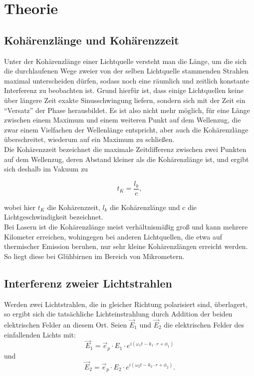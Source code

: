 \section{Theorie}

\subsection{Kohärenzlänge und Kohärenzzeit}
Unter der Kohärenzlänge einer Lichtquelle versteht man die Länge, um die sich die durchlaufenen Wege zweier von der selben Lichtquelle stammenden Strahlen maximal unterscheiden dürfen, sodass noch eine räumlich und zeitlich konstante Interferenz zu beobachten ist. Grund hierfür ist, dass einige Lichtquellen keine über längere Zeit exakte Sinusschwingung liefern, sondern sich mit der Zeit ein \enquote{Versatz} der Phase herausbildet. Es ist also nicht mehr möglich, für eine Länge zwischen einem Maximum und einem weiteren Punkt auf dem Wellenzug, die zwar einem Vielfachen der Wellenlänge entspricht, aber auch die Kohärenzlänge überschreitet, wiederum auf ein Maximum zu schließen. \\
Die Kohärenzzeit bezeichnet die maximale Zeitdifferenz zwischen zwei Punkten auf dem Wellenzug, deren Abstand kleiner als die Kohärenzlänge ist, und ergibt sich deshalb im Vakuum zu 

\begin{equation}
t_{K} = \frac{l_{k}}{c},
\end{equation}

wobei hier $ t_{K} $ die Kohärenzzeit, $ l_{k} $ die Kohärenzlänge und c die Lichtgeschwindigkeit bezeichnet. \\
Bei Lasern ist die Kohärenzlänge meist verhältnismäßig groß und kann mehrere Kilometer erreichen, wohingegen bei anderen Lichtquellen, die etwa auf thermischer Emission beruhen, nur sehr kleine Kohärenzlängen erreicht werden. So liegt diese bei Glühbirnen im Bereich von Mikrometern. 

\subsection{Interferenz zweier Lichtstrahlen}
Werden zwei Lichtstrahlen, die in gleicher Richtung polarisiert sind, überlagert, so ergibt sich die tatsächliche Lichteinstrahlung durch Addition der beiden elektrischen Felder an diesem Ort. 
Seien $ \vec{E}_{1} $ und $ \vec{E}_{2} $ die elektrischen Felder des einfallenden Lichts mit: 
\begin{equation}
\vec{E}_{1} = \vec{e}_{p} \cdot E_{1} \cdot e^{i(\omega_{1}t - k_{1} \cdot r + \phi_{1})}
\end{equation} und 
\begin{equation}
\vec{E}_{2} = \vec{e}_{p} \cdot E_{2} \cdot e^{i(\omega_{2}t - k_{2} \cdot r + \phi_{2})}.
\end{equation}

